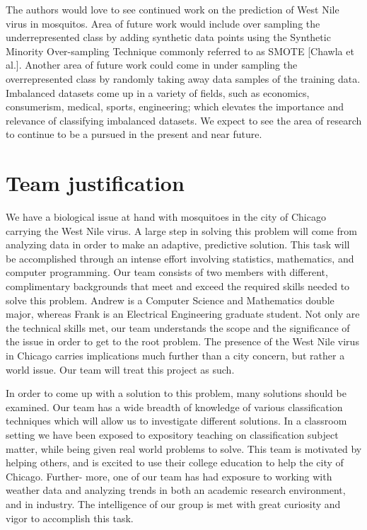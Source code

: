 \documentclass{article} %
\begin{document}
The authors would love to see continued work on the prediction of West Nile virus in mosquitos.  Area of future work would include over sampling the underrepresented class by adding synthetic data points using the Synthetic Minority Over-sampling Technique commonly referred to as SMOTE [Chawla et al.].  Another area of future work could come in under sampling the overrepresented class by randomly taking away data samples of the training data.  Imbalanced datasets come up in a variety of fields, such as economics, consumerism, medical, sports, engineering; which elevates the importance and relevance of classifying imbalanced datasets.  We expect to see the area of research to continue to be a pursued in the present and near future.

\section{Team justification}
We have a biological issue at hand with mosquitoes in the city of Chicago carrying the West Nile virus. A large step in solving this problem will come from analyzing data in order to make an adaptive, predictive solution. This task will be accomplished through an intense effort involving statistics, mathematics, and computer programming. Our team consists of two members with different, complimentary backgrounds that meet and exceed the required skills needed to solve this problem. Andrew is a Computer Science and Mathematics double major, whereas Frank is an Electrical Engineering graduate student. Not only are the technical skills met, our team understands the scope and the significance of the issue in order to get to the root problem. The presence of the West Nile virus in Chicago carries implications much further than a city concern, but rather a world issue. Our team will treat this project as such. 

In order to come up with a solution to this problem, many solutions should be examined. Our team has a wide breadth of knowledge of various classification techniques which will allow us to investigate different solutions. In a classroom setting we have been exposed to expository teaching on classification subject matter, while being given real world problems to solve. This team is motivated by helping others, and is excited to use their college education to help the city of Chicago. Further- more, one of our team has had exposure to working with weather data and analyzing trends in both an academic research environment, and in industry. The intelligence of our group is met with great curiosity and vigor to accomplish this task. 
\end{document}
